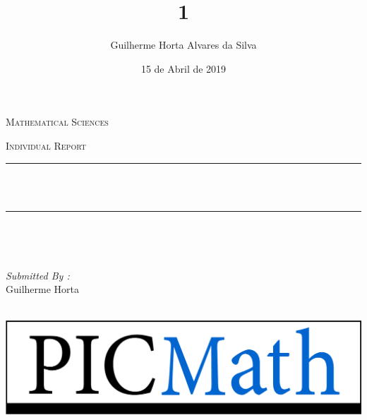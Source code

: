 \documentclass[12pt]{report}
\title{1}
\author{Guilherme Horta Alvares da Silva}
\date{15 de Abril de 2019}
\makeatletter
\let\thetitle\@title
\makeatother
\begin{document}

\begin{titlepage}
	\centering
    \vspace*{0.5 cm}
\begin{center}    \textsc{\Large   Mathematical Sciences}\\[2.0 cm]	\end{center}%
	\textsc{\Large Individual Report  }\\[0.5 cm]				%
	\rule{\linewidth}{0.2 mm} \\[0.4 cm]
	{ \huge \bfseries \thetitle}\\
	\rule{\linewidth}{0.2 mm} \\[1.5 cm]
	
	\begin{minipage}{0.4\textwidth}
		\begin{flushleft} \large
			\end{flushleft}
			\end{minipage}~
			\begin{minipage}{0.4\textwidth}
            
			\begin{flushright} \large
			\emph{Submitted By :} \\
			Guilherme Horta  
		\end{flushright}
           
	\end{minipage}\\[2 cm]
	
	\includegraphics[scale = 0.5]{PICMathLogo.png}
    
    
    
    
	
\end{titlepage}
\end{document}
